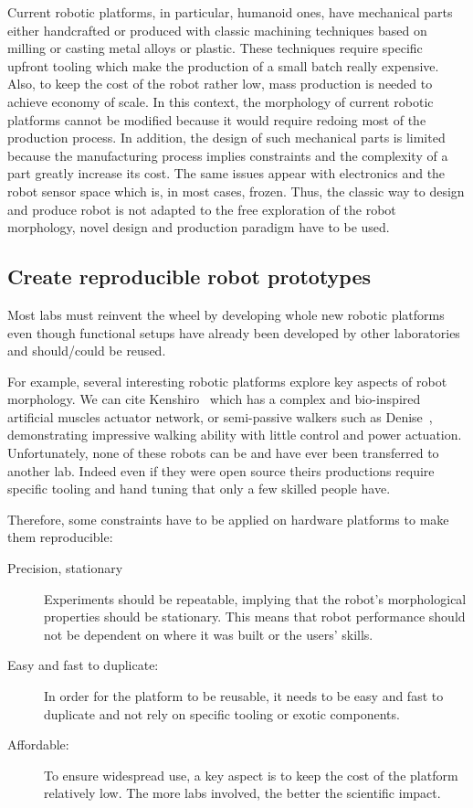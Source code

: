 Current robotic platforms, in particular, humanoid ones, have mechanical parts either handcrafted or produced with classic machining techniques based on milling or casting metal alloys or plastic.
These techniques require specific upfront tooling which make the production of a small batch really expensive. Also, to keep the cost of the robot rather low, mass production is needed to achieve economy of scale. In this context, the morphology of current robotic platforms cannot be modified because it would require redoing most of the production process. In addition, the design of such mechanical parts is limited because the manufacturing process implies constraints and the complexity of a part greatly increase its cost. The same issues appear with electronics and the robot sensor space which is, in most cases, frozen. Thus, the classic way to design and produce robot is not adapted to the free exploration of the robot morphology, novel design and production paradigm have to be used.


\subsection{Create reproducible robot prototypes} %

Most labs must reinvent the wheel by developing whole new robotic platforms even though functional setups have already been developed by other laboratories and should/could be reused.

For example, several interesting robotic platforms explore key aspects of robot morphology. We can cite Kenshiro~\parencite{nakanishi2013design} which has a complex and bio-inspired artificial muscles actuator network, or semi-passive walkers such as Denise~\parencite{wisse2005three}, demonstrating impressive walking ability with little control and power actuation. Unfortunately, none of these robots can be and have ever been transferred to another lab. Indeed even if they were open source theirs productions require specific tooling and hand tuning that only a few skilled people have.

Therefore, some constraints have to be applied on hardware platforms to make them reproducible:
\begin{description}
    \item[Precision, stationary] Experiments should be repeatable, implying that the robot’s morphological properties should be stationary. This means that robot performance should not be dependent on where it was built or the users’ skills.
    \item[Easy and fast to duplicate:] In order for the platform to be reusable, it needs to be easy and fast to duplicate and not rely on specific tooling or exotic components.
    \item[Affordable:] To ensure widespread use, a key aspect is to keep the cost of the platform relatively low. The more labs involved, the better the scientific impact.
\end{description}


